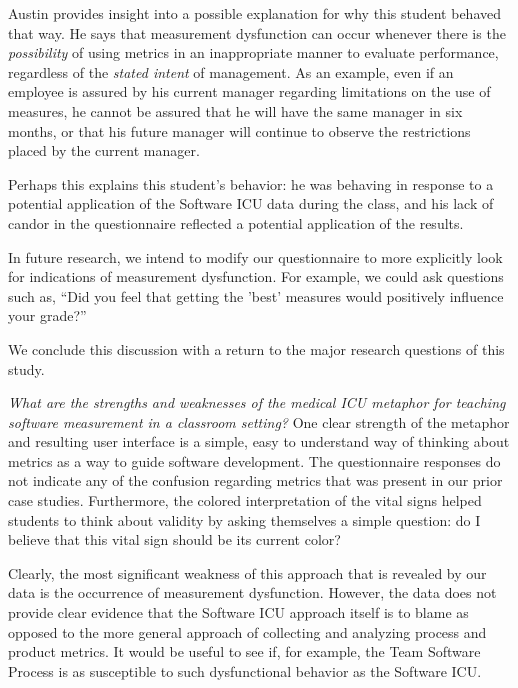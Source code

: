 \documentclass[times,10pt,twocolumn]{article}
\begin{document}
Austin provides insight into a possible explanation for why this student
behaved that way.  He says that measurement dysfunction can occur whenever
there is the {\em possibility} of using metrics in an inappropriate manner
to evaluate performance, regardless of the {\em stated intent} of
management.  As an example, even if an employee is assured by his current
manager regarding limitations on the use of measures, he cannot be assured
that he will have the same manager in six months, or that his future
manager will continue to observe the restrictions placed by the current
manager.

Perhaps this explains this student's behavior: he was behaving in response
to a potential application of the Software ICU data during the class, and
his lack of candor in the questionnaire reflected a potential application
of the results.

In future research, we intend to modify our questionnaire to more
explicitly look for indications of measurement dysfunction.  For example,
we could ask questions such as, ``Did you feel that getting the 'best'
measures would positively influence your grade?''


We conclude this discussion with a return to the major research questions of this study. 

{\em What are the strengths and weaknesses of the medical ICU metaphor
for teaching software measurement in a classroom setting?}  One clear
strength of the metaphor and resulting user interface is a simple, easy to
understand way of thinking about metrics as a way to guide software
development.  The questionnaire responses do not indicate any of the
confusion regarding metrics that was present in our prior case studies.
Furthermore, the colored interpretation of the vital signs helped students
to think about validity by asking themselves a simple question: do I believe
that this vital sign should be its current color?  

Clearly, the most significant weakness of this approach that is revealed by
our data is the occurrence of measurement dysfunction. However, the data
does not provide clear evidence that the Software ICU approach itself is to
blame as opposed to the more general approach of collecting and analyzing
process and product metrics.  It would be useful to see if, for example,
the Team Software Process is as susceptible to such dysfunctional behavior
as the Software ICU.
\end{document}
